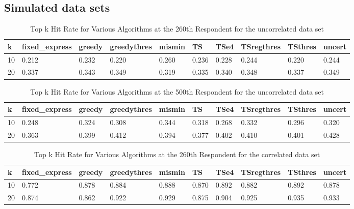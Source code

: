 \documentclass[nonblindrev]{informs3}
\begin{document}
\subsection{Simulated data sets}
\begin{table}
\begin{center}
\begin{tabular}{llllllllll}
\hline   k &  fixed\_express &  greedy &  greedythres &  mismin &    TS &  TSe4 &  TSregthres &  TSthres &  uncert \\\hline    10 &   0.212 &   	0.232 &   0.220 &   0.260 & 0.236 & 0.228 & 0.244 &    0.220 &   	0.244 \\  20 &  0.337 & 0.343 & 0.349 & 0.319 & 0.335 & 0.340 &  0.348 & 0.337 & 0.349 \end{tabular}
\end{center}
\caption{Top k Hit Rate for Various Algorithms at the 260th Respondent for the uncorrelated data set}
\label{table:bad260}
\end{table}
\begin{table}
\begin{center}
\begin{tabular}{llllllllll}
\hline   k &  fixed\_express &  greedy &  greedythres &  mismin &    TS &  TSe4 &  TSregthres &  TSthres &  uncert \\\hline    10 &  0.248 &   0.324	&0.308&	0.344 &0.318 & 0.268 & 	0.332	&0.296 &   0.320 \\  20 & 0.363	&0.399&	0.412& 	0.394 & 0.377&0.402 &  0.410&0.401 &   0.428 \end{tabular}
\end{center}
\caption{Top k Hit Rate for Various Algorithms at the 500th Respondent for the uncorrelated data set}
\label{table:bad500}
\end{table}
\begin{table}
\begin{center}
\begin{tabular}{llllllllll}
\hline   k &  fixed\_express &  greedy &  greedythres &  mismin &    TS &  TSe4 &  TSregthres &  TSthres &  uncert \\\hline  10 & 0.772 &   0.878 & 0.884 & 0.888 & 0.870&0.892 & 	0.882&0.892 &   0.878 \\  20 &  0.874 &  0.862 &   0.922 &  0.929 & 0.875&0.904 &  	0.925&0.935 &  0.933 \end{tabular}
\end{center}
\caption{Top k Hit Rate for Various Algorithms at the 260th Respondent for the correlated data set}
\label{table:nice260}
\end{table}
\end{document}
